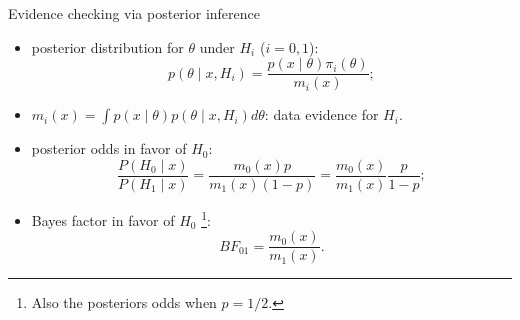 \documentclass[11pt
,fragile=singleslide
,xcolor=dvipsnames
]{beamer}
\begin{document}
	\begin{frame}{Evidence checking via posterior inference}
		\begin{itemize}
			\item posterior distribution for $\theta$ under $H_i$ ($i=0,1$):
			\begin{equation*}
			p(\theta \mid x, H_i) = \frac{p(x \mid \theta) \pi_i(\theta)}{m_i(x)};
			\end{equation*}
			\item $m_i(x) = \int p(x \mid \theta) p(\theta \mid x, H_i) d\theta$: \textcolor{Cerulean}{data evidence} for $H_i$. 
			\pause
			\item posterior odds in favor of $H_0$:
			\begin{equation*}
			\frac{P(H_0 \mid x)}{P(H_1 \mid x)} = \frac{m_0(x) p}{m_1(x) (1-p)} = \frac{m_0(x)}{m_1(x)} \frac{p}{1-p};
			\end{equation*}
			\pause
			\item \textcolor{Cerulean}{Bayes factor} in favor of $H_0$ \footnote{Also the posteriors odds when $p=1/2$.}:
			\begin{equation*}
			\label{eq:bayes-factor}
			BF_{01} = \frac{m_0(x)}{m_1(x)}.
			\end{equation*}
		\end{itemize}
		
	\end{frame}
	
\end{document}
